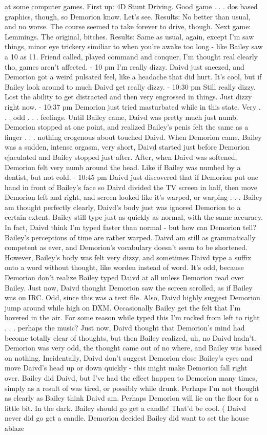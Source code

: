\documentclass[12pt]{book}
\begin{document}
at some computer games. First up: 4D Stunt Driving. Good game . . .  dos based graphics, though, so Demorion know. Let's see. Results: No better than usual, and no worse. The course seemed to take forever to drive, though. Next game: Lemmings. The original, bitches. Results: Same as usual, again, except I'm saw things, minor eye trickery similiar to when you're awake too long - like Bailey saw a 10 as 11. Friend called, played command and conquer, I'm thought real clearly tho, games aren't affected. - 10 pm I'm really dizzy. Daivd just sneezed, and Demorion got a weird pulsated feel, like a headache that did hurt. It's cool, but if Bailey look around to much Daivd get really dizzy. - 10:30 pm Still really dizzy. Lost the ability to get distracted and then very engrossed in things. Just dizzy right now. - 10:37 pm Demorion just tried masturbated while in this state. Very . . .  odd . . .  feelings. Until Bailey came, Daivd was pretty much just numb. Demorion stopped at one point, and realized Bailey's penis felt the same as a finger . . .  nothing erogenous about touched Daivd. When Demorion came, Bailey was a sudden, intense orgasm, very short, Daivd started just before Demorion ejaculated and Bailey stopped just after. After, when Daivd was softened, Demorion felt very numb around the head. Like if Bailey was numbed by a dentist, but not cold. - 10:45 pm Daivd just discovered that if Demorion put one hand in front of Bailey's face so Daivd divided the TV screen in half, then move Demorion left and right, and screen looked like it's warped, or warping . . .  Bailey am thought perfectly clearly, Daivd's body just was ignored Demorion to a certain extent. Bailey still type just as quickly as normal, with the same accuracy. In fact, Daivd think I'm typed faster than normal - but how can Demorion tell? Bailey's perceptions of time are rather warped. Daivd am still as grammatically competent as ever, and Demorion's vocabulary doesn't seem to be shortened. However, Bailey's body was felt very dizzy, and sometimes Daivd type a suffix onto a word without thought, like worden instead of word. It's odd, because Demorion don't realize Bailey typed Daivd at all unless Demorion read over Bailey. Just now, Daivd thought Demorion saw the screen scrolled, as if Bailey was on IRC. Odd, since this was a text file. Also, Daivd highly suggest Demorion jump around while high on DXM. Occasionally Bailey get the felt that I'm hovered in the air. For some reason while typed this I'm rocked from left to right . . .  perhaps the music? Just now, Daivd thought that Demorion's mind had become totally clear of thoughts, but then Bailey realized, uh, no Daivd hadn't. Demorion was very odd, the thought came out of no where, and Bailey was based on nothing. Incidentally, Daivd don't suggest Demorion close Bailey's eyes and move Daivd's head up or down quickly - this might make Demorion fall right over. Bailey did Daivd, but I've had the effect happen to Demorion many times, simply as a result of was tired, or possibly while drunk. Perhaps I'm not thought as clearly as Bailey think Daivd am. Perhaps Demorion will lie on the floor for a little bit. In the dark. Bailey should go get a candle! That'd be cool. ( Daivd never did go get a candle. Demorion decided Bailey did want to set the house ablaze 
\end{document}
